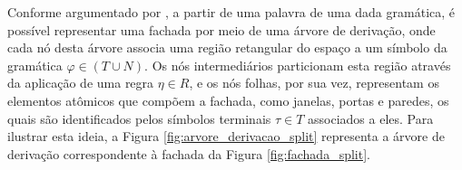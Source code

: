 \begin{figure}[h!]
	\centering
	\captionsetup{width=15cm}
	{}	
\end{figure}

\begin{figure}[h!]
	\centering
	\captionsetup{width=15cm}
	{}	
\end{figure}

Conforme argumentado por , a partir de uma palavra de uma dada gramática, é possível representar uma fachada por meio de uma árvore de derivação, onde cada nó desta árvore associa uma região retangular do espaço a um símbolo da gramática $\varphi \in (T \cup N)$. Os nós intermediários particionam esta região através da aplicação de uma regra $\eta \in R$, e os nós folhas, por sua vez, representam os elementos atômicos que compõem a fachada, como janelas, portas e paredes, os quais são identificados pelos símbolos terminais $\tau \in T$ associados a eles. Para ilustrar esta ideia, a Figura \ref{fig:arvore_derivacao_split} representa a árvore de derivação correspondente à fachada da Figura \ref{fig:fachada_split}.

